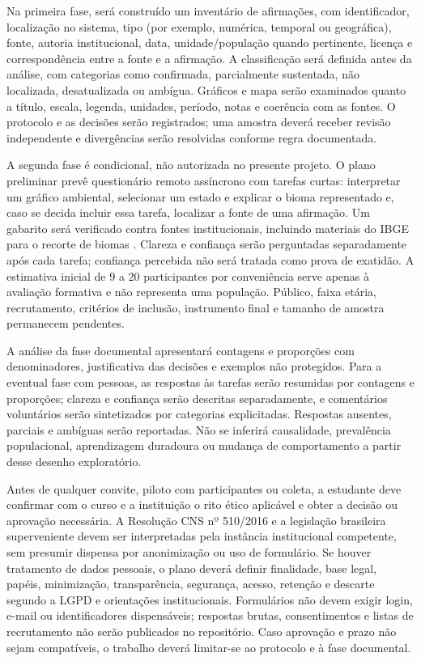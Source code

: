\documentclass[12pt,oneside,a4paper,brazil]{abntex2}
\begin{document}
Na primeira fase, será construído um inventário de afirmações, com identificador, localização no sistema, tipo (por exemplo, numérica, temporal ou geográfica), fonte, autoria institucional, data, unidade/população quando pertinente, licença e correspondência entre a fonte e a afirmação. A classificação será definida antes da análise, com categorias como confirmada, parcialmente sustentada, não localizada, desatualizada ou ambígua. Gráficos e mapa serão examinados quanto a título, escala, legenda, unidades, período, notas e coerência com as fontes. O protocolo e as decisões serão registrados; uma amostra deverá receber revisão independente e divergências serão resolvidas conforme regra documentada.

A segunda fase é condicional, não autorizada no presente projeto. O plano preliminar prevê questionário remoto assíncrono com tarefas curtas: interpretar um gráfico ambiental, selecionar um estado e explicar o bioma representado e, caso se decida incluir essa tarefa, localizar a fonte de uma afirmação. Um gabarito será verificado contra fontes institucionais, incluindo materiais do IBGE para o recorte de biomas \cite{ibge}. Clareza e confiança serão perguntadas separadamente após cada tarefa; confiança percebida não será tratada como prova de exatidão. A estimativa inicial de 9 a 20 participantes por conveniência serve apenas à avaliação formativa e não representa uma população. Público, faixa etária, recrutamento, critérios de inclusão, instrumento final e tamanho de amostra permanecem pendentes.

A análise da fase documental apresentará contagens e proporções com denominadores, justificativa das decisões e exemplos não protegidos. Para a eventual fase com pessoas, as respostas às tarefas serão resumidas por contagens e proporções; clareza e confiança serão descritas separadamente, e comentários voluntários serão sintetizados por categorias explicitadas. Respostas ausentes, parciais e ambíguas serão reportadas. Não se inferirá causalidade, prevalência populacional, aprendizagem duradoura ou mudança de comportamento a partir desse desenho exploratório.

Antes de qualquer convite, piloto com participantes ou coleta, a estudante deve confirmar com o curso e a instituição o rito ético aplicável e obter a decisão ou aprovação necessária. A Resolução CNS nº 510/2016 e a legislação brasileira superveniente devem ser interpretadas pela instância institucional competente, sem presumir dispensa por anonimização ou uso de formulário. Se houver tratamento de dados pessoais, o plano deverá definir finalidade, base legal, papéis, minimização, transparência, segurança, acesso, retenção e descarte segundo a LGPD e orientações institucionais. Formulários não devem exigir login, e-mail ou identificadores dispensáveis; respostas brutas, consentimentos e listas de recrutamento não serão publicados no repositório. Caso aprovação e prazo não sejam compatíveis, o trabalho deverá limitar-se ao protocolo e à fase documental.
\end{document}
